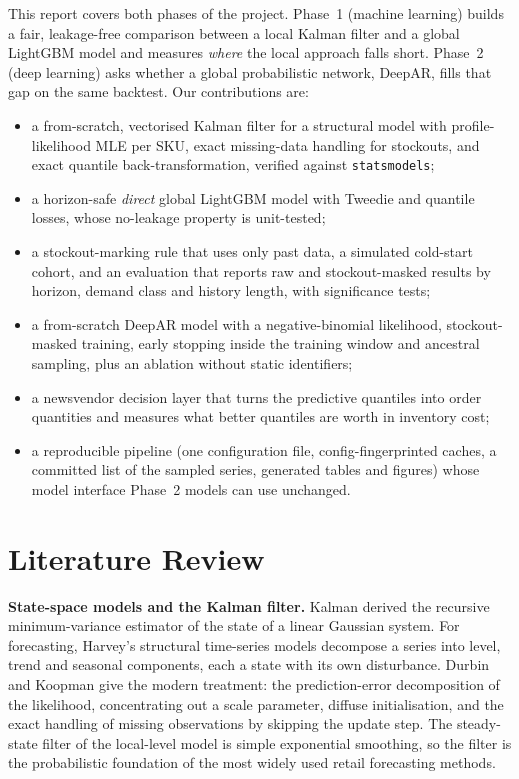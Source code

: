 \documentclass[conference]{IEEEtran}
\begin{document}
This report covers both phases of the project. Phase~1 (machine learning) builds a fair, leakage-free comparison between a local Kalman filter and a global LightGBM model and measures \emph{where} the local approach falls short. Phase~2 (deep learning) asks whether a global probabilistic network, DeepAR, fills that gap on the same backtest. Our contributions are:
\begin{itemize}
\item a from-scratch, vectorised Kalman filter for a structural model with profile-likelihood MLE per SKU, exact missing-data handling for stockouts, and exact quantile back-transformation, verified against \texttt{statsmodels};
\item a horizon-safe \emph{direct} global LightGBM model with Tweedie and quantile losses, whose no-leakage property is unit-tested;
\item a stockout-marking rule that uses only past data, a simulated cold-start cohort, and an evaluation that reports raw and stockout-masked results by horizon, demand class and history length, with significance tests;
\item a from-scratch DeepAR model with a negative-binomial likelihood, stockout-masked training, early stopping inside the training window and ancestral sampling, plus an ablation without static identifiers;
\item a newsvendor decision layer that turns the predictive quantiles into order quantities and measures what better quantiles are worth in inventory cost;
\item a reproducible pipeline (one configuration file, config-fingerprinted caches, a committed list of the sampled series, generated tables and figures) whose model interface Phase~2 models can use unchanged.
\end{itemize}

\section{Literature Review}
\label{sec:lit}
\textbf{State-space models and the Kalman filter.} Kalman derived the recursive minimum-variance estimator of the state of a linear Gaussian system. For forecasting, Harvey's structural time-series models decompose a series into level, trend and seasonal components, each a state with its own disturbance. Durbin and Koopman give the modern treatment: the prediction-error decomposition of the likelihood, concentrating out a scale parameter, diffuse initialisation, and the exact handling of missing observations by skipping the update step. The steady-state filter of the local-level model is simple exponential smoothing, so the filter is the probabilistic foundation of the most widely used retail forecasting methods.
\end{document}
